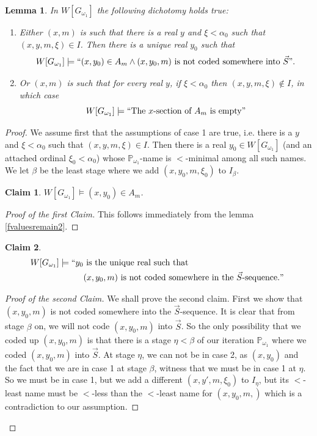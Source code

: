 \documentclass[a4paper,11pt]{article}
\newtheorem{lemma}[theorem]{Lemma}
\newtheorem{claim}{Claim}
\newcommand{\forceP}{\mathbb{P}}
\begin{document}
\begin{lemma}
In $W[G_{\omega_1}]$ the following dichotomy holds true:
\begin{enumerate}
\item Either $(x,m)$ is such that there is a real $y$ and $\xi <  \alpha_0$ such that $(x,y,m,\xi)\in I$. Then there is a unique real $y_0$ such that
\[W[G_{\omega_1}] \models`` (x,y_0) \in A_m \land (x,y_0,m) \text{ is not coded somewhere into } \vec{S}". \]

\item Or $(x,m)$ is such that for every real $y$, if $\xi< \alpha_0$ then $(x,y,m,\xi) \notin I$, in which case 
\[W[G_{\omega_1}] \models `` \text{The $x$-section of $A_m$ is empty}" \]
\end{enumerate}
\end{lemma}
\begin{proof}
We assume first that the assumptions of case 1 are true, i.e. there is a $y$ and $\xi < \alpha_0$ such that $(x,y,m,\xi) \in I$. Then there is a real $y_0 \in W[G_{\omega_1}]$ (and an attached ordinal $\xi_0 < \alpha_0$) whose
$\forceP_{\omega_1}$-name is $<$-minimal among all such names.
We let $\beta$ be the least stage where we add $(x,y_0,m,\xi_0)$ to $I_{\beta}$.
\par \medskip

\begin{claim}
$W[G_{\omega_1}] \models (x,y_0) \in A_m$.
\end{claim}
\begin{proof}[Proof of the first Claim]
This follows immediately from the lemma \ref{fvaluesremain2}.
\end{proof}


\par \medskip

\begin{claim}
\begin{align*}
 W[G_{\omega_1}] \models``y_0 & \text{ is the unique real such that }  \\& (x,y_0,m) \text{ is not coded somewhere in the $\vec{S}$-sequence.$"$ }
\end{align*}
\end{claim}
\begin{proof}[Proof of the second Claim]
We shall prove the second claim. First we show that $(x,y_0,m)$ is not coded somewhere into the $\vec{S}$-sequence. It is clear that from stage $\beta$ on, we will not code $(x,y_0,m)$ into $\vec{S}$. So the only possibility that we coded up $(x,y_0,m)$ is that there is a stage $\eta < \beta$ of our iteration $\forceP_{\omega_1}$ where we coded $(x,y_0,m)$ into $\vec{S}$. 
At stage $\eta$, we can not be in case 2, as $(x,y_0)$ and the fact that we are in case 1 at stage $\beta$, witness that we must be in case 1 at $\eta$.
So we must be in case 1, but we add a different $(x,y',m,\xi_0)$ to $I_{\eta}$, but its $<$-least name must be $<$-less than the $<$-least name for $(x,y_0,m,)$ which is a contradiction to our assumption.


\end{proof}
\end{proof}
\end{document}
